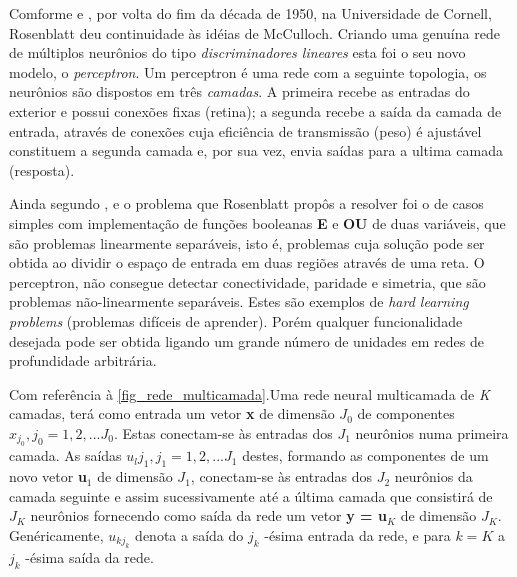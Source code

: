 \documentclass[
	12pt,				%
	openright,			%
	twoside,			%
	a4paper,			%
	english,			%
	french,				%
	spanish,			%
	brazil				%
	]{abntex2}
\begin{document}
Comforme  e , por volta do fim da década de 1950, na Universidade de Cornell, Rosenblatt deu continuidade às idéias de McCulloch. Criando uma genuína rede de múltiplos neurônios do tipo \emph{discriminadores lineares} esta foi o seu novo modelo, o \emph{perceptron}. Um perceptron é uma rede com a seguinte topologia, os neurônios são dispostos em três \emph{camadas}. A primeira recebe as entradas do exterior e possui conexões fixas (retina); a segunda recebe a saída da camada de entrada, através de conexões cuja eficiência de transmissão (peso) é ajustável constituem a segunda camada e, por sua vez, envia saídas para a ultima camada (resposta).

Ainda segundo ,   e  o problema que Rosenblatt propôs a resolver foi o de casos simples com implementação de funções booleanas \textbf{E} e \textbf{OU} de duas variáveis, que são problemas linearmente separáveis, isto é, problemas cuja solução pode ser obtida ao dividir o espaço de entrada em duas regiões através de uma reta. O perceptron, não consegue detectar conectividade, paridade e simetria, que são problemas não-linearmente separáveis. Estes são exemplos de \textit{hard learning problems} (problemas difíceis de aprender). Porém qualquer funcionalidade desejada pode ser obtida ligando um grande número de unidades em redes de profundidade arbitrária.

Com referência à \autoref{fig_rede_multicamada}.Uma rede neural multicamada de \emph{K} camadas, terá como entrada um vetor \textbf{x} de dimensão $J_0$ de componentes $x_{j_0}, j_0 = 1,2, ... J_0$. Estas conectam-se às entradas dos $J_1$ neurônios numa primeira camada. As saídas $u_lj_1,j_1 = 1,2, ... J_1$ destes, formando as componentes de um novo vetor \textbf{u$_1$} de dimensão $J_1$, conectam-se às entradas dos $J_2$ neurônios da camada seguinte e assim sucessivamente até a última camada que consistirá de $J_K$ neurônios fornecendo como saída da rede um vetor \textbf{y = u$_K$} de dimensão $J_K$. Genéricamente, $u_{kj_k}$ denota a saída do $j_k$ -ésima entrada da rede, e para $k=K$ a $j_k$ -ésima saída da rede.\cite[p. 39--40]{kovacs2002redes}
\end{document}

